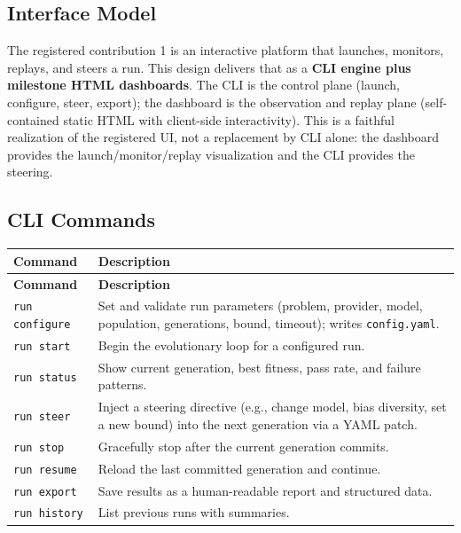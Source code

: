 \documentclass[12pt,a4paper]{article}
\begin{document}
\subsection{Interface Model}

The registered contribution 1 is an interactive platform that launches, monitors, replays, and steers a run. This design delivers that as a \textbf{CLI engine plus milestone HTML dashboards}. The CLI is the control plane (launch, configure, steer, export); the dashboard is the observation and replay plane (self-contained static HTML with client-side interactivity). This is a faithful realization of the registered UI, not a replacement by CLI alone: the dashboard provides the launch/monitor/replay visualization and the CLI provides the steering.

\subsection{CLI Commands}

\begin{longtable}{|p{4cm}|p{10cm}|}
\hline
\textbf{Command} & \textbf{Description} \\
\hline
\endfirsthead
\hline
\textbf{Command} & \textbf{Description} \\
\hline
\endhead
\hline
\endfoot

\texttt{run configure} & Set and validate run parameters (problem, provider, model, population, generations, bound, timeout); writes \texttt{config.yaml}. \\
\hline
\texttt{run start} & Begin the evolutionary loop for a configured run. \\
\hline
\texttt{run status} & Show current generation, best fitness, pass rate, and failure patterns. \\
\hline
\texttt{run steer} & Inject a steering directive (e.g., change model, bias diversity, set a new bound) into the next generation via a YAML patch. \\
\hline
\texttt{run stop} & Gracefully stop after the current generation commits. \\
\hline
\texttt{run resume} & Reload the last committed generation and continue. \\
\hline
\texttt{run export} & Save results as a human-readable report and structured data. \\
\hline
\texttt{run history} & List previous runs with summaries. \\
\hline
\end{longtable}
\end{document}
